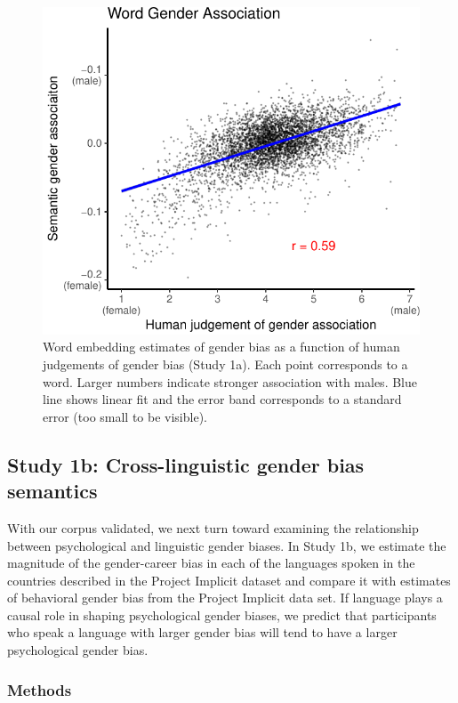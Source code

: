 \documentclass[man,floatsintext]{apa6}
\theoremstyle{definition}
\theoremstyle{definition}
\theoremstyle{definition}
\theoremstyle{remark}
\begin{document}
\begin{figure}
\centering
\includegraphics{iat_lang_files/figure-latex/unnamed-chunk-10-1.pdf}
\caption{\label{fig:unnamed-chunk-10}Word embedding estimates of gender bias
as a function of human judgements of gender bias (Study 1a). Each point
corresponds to a word. Larger numbers indicate stronger association with
males. Blue line shows linear fit and the error band corresponds to a
standard error (too small to be visible).}
\end{figure}

\subsection{Study 1b: Cross-linguistic gender bias
semantics}\label{study-1b-cross-linguistic-gender-bias-semantics}

With our corpus validated, we next turn toward examining the
relationship between psychological and linguistic gender biases. In
Study 1b, we estimate the magnitude of the gender-career bias in each of
the languages spoken in the countries described in the Project Implicit
dataset and compare it with estimates of behavioral gender bias from the
Project Implicit data set. If language plays a causal role in shaping
psychological gender biases, we predict that participants who speak a
language with larger gender bias will tend to have a larger
psychological gender bias.

\subsubsection{Methods}\label{methods-1}
\end{document}
